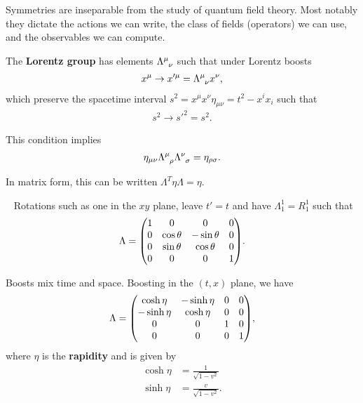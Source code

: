 Symmetries are inseparable from the study of quantum field theory. Most notably they dictate the actions we can write, the class of fields (operators) we can use, and the observables we can compute.

\begin{definition}
    The \textbf{Lorentz group} has elements $\tensor{\Lambda}{^{\mu}_{\nu}}$ such that under Lorentz boosts
    \begin{align}
        x^{\mu} \to x'^{\mu} = \tensor{\Lambda}{^{\mu}_{\nu}} x^{\nu}
    ,\end{align}
    which preserve the spacetime interval $s^2 = x^{\mu} x^{\nu} \eta_{\mu \nu} = t^2 - x^{i} x_{i}$ such that
    \begin{align}
        s^2 \to s'^2 = s^2
    .\end{align}
\end{definition}

This condition implies
\begin{align}
    \eta_{\mu \nu} \tensor{\Lambda}{^{\mu}_{\rho}} \tensor{\Lambda}{^{\nu}_{\sigma}} = \eta_{\rho \sigma} \label{eq:eta_relation}
.\end{align}

In matrix form, this can be written $\Lambda^{T} \eta \Lambda = \eta$.

\begin{examples}~
    Rotations such as one in the $xy$ plane, leave $t' = t$ and have $\Lambda^{1}_1 = R^{1}_1$ such that
    \begin{align}
        \Lambda = \mqty( 1 & 0 & 0 & 0 \\ 0 & \cos \theta & - \sin \theta & 0 \\ 0 & \sin \theta & \cos \theta & 0 \\ 0 & 0 & 0 & 1 )
    .\end{align}
    \item Boosts mix time and space. Boosting in the $\left( t,x \right) $ plane, we have
        \begin{align}
            \Lambda = \mqty( \cosh \eta & - \sinh \eta & 0 & 0 \\ - \sinh \eta & \cosh \eta & 0 & 0 \\ 0 & 0 & 1 & 0 \\ 0 & 0 & 0 & 1 )
        ,\end{align}
        where $\eta$ is the \textbf{rapidity} and is given by
        \begin{align}
            \cosh \eta &= \frac{1}{\sqrt{1 - v^2} } \\
            \sinh \eta &= \frac{v}{\sqrt{1 - v^2} }
        .\end{align}
\end{examples}

